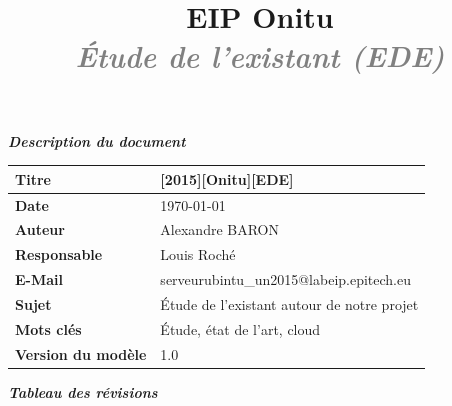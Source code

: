 \documentclass[12pt]{report}
\title{
	\huge{\textbf{\textcolor{epiBlue}{EIP Onitu} } }\\
	\Large{\textbf{\emph{\textcolor{gray}{Étude de l'existant (EDE)} } } }
}
\newcommand{\DocTitle}{[2015][Onitu][EDE]}
\begin{document}
\maketitle



\thispagestyle{empty}
\vspace*{10mm}
\textbf{\emph{\textcolor{epiBlue}{Description du document} } }\\

\begin{tabular}{|>{\columncolor[gray]{0.85}\color{epiBlue} \bfseries } l|l|}
\hline
	Titre & \DocTitle\\
\hline
	Date & \dashDate\today \\
\hline
	Auteur & Alexandre BARON\\
\hline
	Responsable & Louis Roché\\
\hline
	E-Mail & serveurubintu\_un2015@labeip.epitech.eu\\
\hline
	Sujet & Étude de l'existant autour de notre projet\\
\hline
	Mots clés & Étude, état de l'art, cloud\\
\hline
	Version du modèle & 1.0\\
\hline
\end{tabular}
\vspace*{10mm}

\textbf{\emph{\textcolor{epiBlue}{Tableau des révisions} } }\\
\end{document}
